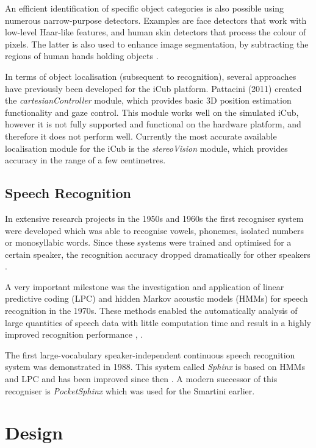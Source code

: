 \documentclass[conference]{IEEEtran}
\begin{document}
An efficient identification of specific object categories is also possible using numerous narrow-purpose detectors. Examples are face detectors \cite{c7} that work with low-level Haar-like features, and human skin detectors \cite{c8} that process the colour of pixels. The latter is also used to enhance image segmentation, by subtracting the regions of human hands holding objects \cite{c9}.

In terms of object localisation (subsequent to recognition), several approaches have previously been developed for the iCub platform. Pattacini (2011) created the \textit{cartesianController} module, which provides basic 3D position estimation functionality and gaze control. This module works well on the simulated iCub, however it is not fully supported and functional on the hardware platform, and therefore it does not perform well. Currently the most accurate available localisation module for the iCub is the \textit{stereoVision} module, which provides accuracy in the range of a few centimetres.

\subsection{Speech Recognition}

In extensive research projects in the 1950s and 1960s the first recogniser system were developed which was able to recognise vowels, phonemes, isolated numbers or monosyllabic words. Since these systems were trained and optimised for a certain speaker, the recognition accuracy dropped dramatically for other speakers \cite{SRhistory}.

A very important milestone was the investigation and application of linear predictive coding (LPC) and hidden Markov acoustic models (HMMs) for speech recognition in the 1970s. These methods enabled the automatically analysis of large quantities of speech data with little computation time and result in a highly improved recognition performance \cite{speechLP}, \cite{SRTechn}.

The first large-vocabulary speaker-independent continuous speech recognition system was demonstrated in 1988. This system called {\it Sphinx} is based on HMMs and LPC and has been improved since then \cite{Sphinx1988}. A modern successor of this recogniser is {\it PocketSphinx} \cite{PocketSphinx} which was used for the Smartini earlier.

\section{Design} \label{design}
\end{document}
